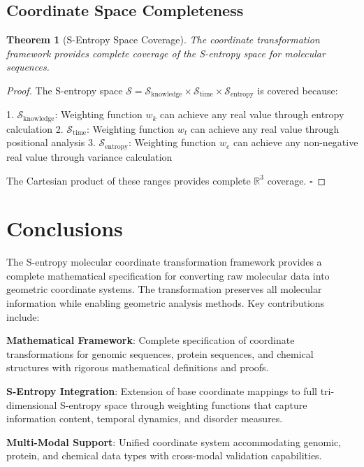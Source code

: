 \documentclass[12pt,a4paper]{article}
\newtheorem{theorem}{Theorem}
\begin{document}
\subsection{Coordinate Space Completeness}

\begin{theorem}[S-Entropy Space Coverage]
The coordinate transformation framework provides complete coverage of the S-entropy space for molecular sequences.
\end{theorem}

\begin{proof}
The S-entropy space $\mathcal{S} = \mathcal{S}_{\text{knowledge}} \times \mathcal{S}_{\text{time}} \times \mathcal{S}_{\text{entropy}}$ is covered because:

1. $\mathcal{S}_{\text{knowledge}}$: Weighting function $w_k$ can achieve any real value through entropy calculation
2. $\mathcal{S}_{\text{time}}$: Weighting function $w_t$ can achieve any real value through positional analysis
3. $\mathcal{S}_{\text{entropy}}$: Weighting function $w_e$ can achieve any non-negative real value through variance calculation

The Cartesian product of these ranges provides complete $\mathbb{R}^3$ coverage. $\square$
\end{proof}

\section{Conclusions}

The S-entropy molecular coordinate transformation framework provides a complete mathematical specification for converting raw molecular data into geometric coordinate systems. The transformation preserves all molecular information while enabling geometric analysis methods. Key contributions include:

\textbf{Mathematical Framework}: Complete specification of coordinate transformations for genomic sequences, protein sequences, and chemical structures with rigorous mathematical definitions and proofs.

\textbf{S-Entropy Integration}: Extension of base coordinate mappings to full tri-dimensional S-entropy space through weighting functions that capture information content, temporal dynamics, and disorder measures.

\textbf{Multi-Modal Support}: Unified coordinate system accommodating genomic, protein, and chemical data types with cross-modal validation capabilities.
\end{document}
